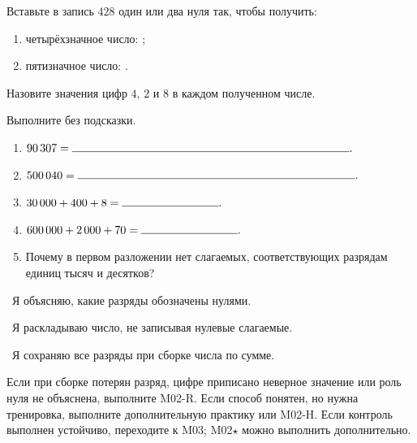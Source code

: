 \begin{practicebox}
  Вставьте в запись \(428\) один или два нуля так, чтобы получить:
  \begin{enumerate}[label=\textbf{\arabic*.}]
    \item четырёхзначное число: \answerblank[30mm];
    \item пятизначное число: \answerblank[30mm].
  \end{enumerate}
  Назовите значения цифр \(4\), \(2\) и \(8\) в каждом полученном числе.
\end{practicebox}
\newpage
\begin{checkpointbox}
  Выполните без подсказки.
  \begin{enumerate}[label=\textbf{\arabic*.}]
    \item \(90\,307=\answerblank[86mm].\)
    \item \(500\,040=\answerblank[86mm].\)
    \item \(30\,000+400+8=\answerblank[30mm].\)
    \item \(600\,000+2\,000+70=\answerblank[30mm].\)
    \item Почему в первом разложении нет слагаемых, соответствующих разрядам
      единиц тысяч и десятков?
  \end{enumerate}
\end{checkpointbox}

\begin{reflectionbox}
  \choicebox\ Я объясняю, какие разряды обозначены нулями.

  \choicebox\ Я раскладываю число, не записывая нулевые слагаемые.

  \choicebox\ Я сохраняю все разряды при сборке числа по сумме.
\end{reflectionbox}

\begin{notebox}
  Если при сборке потерян разряд, цифре приписано неверное значение или роль
  нуля не объяснена, выполните M02-R. Если способ понятен, но нужна тренировка,
  выполните дополнительную практику или M02-H. Если контроль выполнен
  устойчиво, переходите к M03; M02\(\star\) можно выполнить дополнительно.
\end{notebox}
